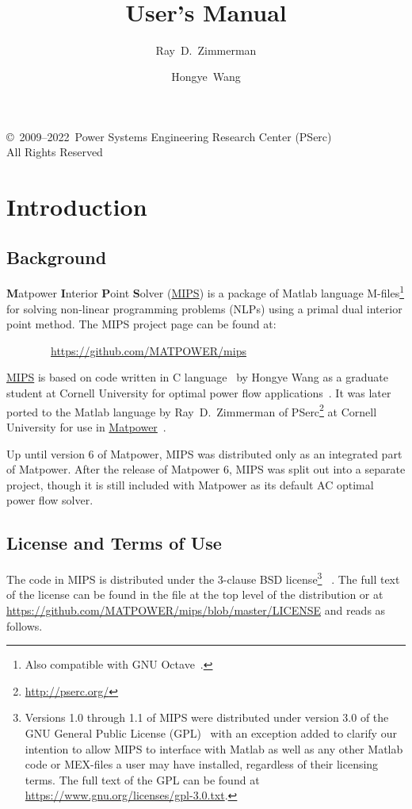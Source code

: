 \documentclass[12pt]{article}
\title{\mipsname{}\\\mips{} \mipsver{}\\
User's Manual}
\author{Ray~D.~Zimmerman \and Hongye~Wang}
\newcommand{\matlab}[0]{{\sc Matlab}}
\newcommand{\matpower}[0]{{\sc Matpower}}
\newcommand{\matpowerurl}[0]{https://matpower.org}
\newcommand{\matpowerlink}[0]{\href{\matpowerurl}{\matpower{}}}
\newcommand{\mips}[0]{{MIPS}}
\newcommand{\mipsurl}[0]{https://github.com/MATPOWER/mips}
\newcommand{\mipslink}[0]{\href{\mipsurl}{\mips{}}}
\newcommand{\mipsname}[0]{{{\bf M}{\sc atpower} \textbf{I}nterior \textbf{P}oint \textbf{S}olver}}
\newcommand{\pserc}[0]{{\sc PSerc}}
\newcommand{\PSERC}[0]{{Power Systems Engineering Research Center (\pserc{})}}
\newcommand{\code}[1]{{\relsize{-0.5}{\tt{{#1}}}}}  %
\numberwithin{equation}{section}
\numberwithin{table}{section}
\numberwithin{figure}{section}
\begin{document}
\maketitle
\thispagestyle{empty}
\vfill
\begin{center}
{\scriptsize
\copyright~2009--2022~\PSERC{}\\
All Rights Reserved}
\end{center}

\clearpage
\tableofcontents
\clearpage
\listoftables

\clearpage
\section{Introduction}

\subsection{Background}

\mipsname{} (\mipslink{}) is a package of \matlab{} language M-files\footnote{Also compatible with GNU Octave~\cite{octave}.} for solving non-linear programming problems (NLPs) using a primal dual interior point method. The \mips{} project page can be found at:

\bigskip

~~~~~~~~\url{\mipsurl}

\bigskip

\mipslink{} is based on code written in C language~\cite{tspopf} by Hongye Wang as a graduate student at Cornell University for optimal power flow applications~\cite{wang2007a,wang2007}. It was later ported to the \matlab{} language by Ray~D.~Zimmerman of \pserc{}\footnote{\url{http://pserc.org/}} at Cornell University for use in \matpowerlink{}~\cite{zimmerman2011,matpower}.

Up until version 6 of \matpower{}, \mips{} was distributed only as an integrated part of \matpower{}. After the release of \matpower{} 6, \mips{} was split out into a separate project, though it is still included with \matpower{} as its default AC optimal power flow solver.


\clearpage
\subsection{License and Terms of Use}

The code in \mips{} is distributed under the 3-clause BSD license\footnote{Versions 1.0 through 1.1 of \mips{} were distributed under version 3.0 of the GNU General Public License (GPL)~\cite{gpl} with an exception added to clarify our intention to allow \mips{} to interface with \matlab{} as well as any other \matlab{} code or MEX-files a user may have installed, regardless of their licensing terms. The full text of the GPL can be found at \url{https://www.gnu.org/licenses/gpl-3.0.txt}.}
~\cite{bsd}. The full text of the license can be found in the \code{LICENSE} file at the top level of the distribution or at \url{https://github.com/MATPOWER/mips/blob/master/LICENSE} and reads as follows.
\end{document}
